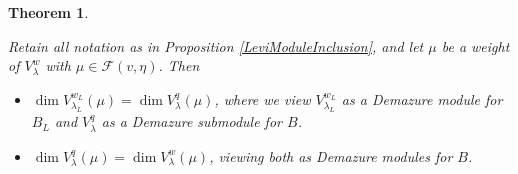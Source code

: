 \documentclass[12pt,reqno]{amsart}
\newtheorem{theorem}{Theorem}[section]
\newtheorem{proposition}[theorem]{Proposition}
\theoremstyle{definition}
\begin{document}
%
%
%











\begin{theorem} \label{PreciseTheorem}

Retain all notation as in Proposition \ref{LeviModuleInclusion}, and let $\mu$ be a weight of $V^w_\lambda$ with $\mu \in \mathcal{F}(v, \eta)$. Then 

\begin{itemize}

\item[(1)]  $\dim V_{\lambda_L}^{w_L}(\mu) = \dim V_\lambda^q(\mu)$, where we view $V_{\lambda_L}^{w_L}$ as a Demazure module for $B_L$ and $V^q_\lambda$ as a Demazure submodule for $B$. 

\item[(2)] $\dim V_\lambda^q(\mu) = \dim V_\lambda^w(\mu)$, viewing both as Demazure modules for $B$. 

\end{itemize}

\end{theorem}
\end{document}
